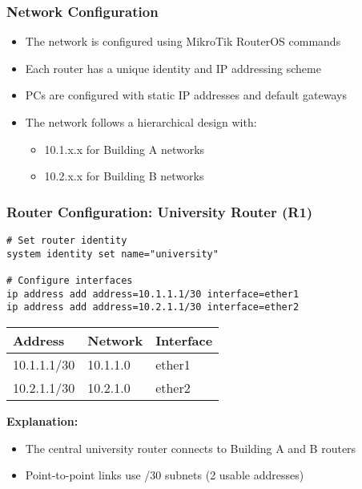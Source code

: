 \documentclass{beamer}
\begin{document}
\begin{frame}[label=config]
\frametitle{Network Configuration}
\begin{itemize}
    \item The network is configured using MikroTik RouterOS commands
    \item Each router has a unique identity and IP addressing scheme
    \item PCs are configured with static IP addresses and default gateways
    \item The network follows a hierarchical design with:
    \begin{itemize}
        \item 10.1.x.x for Building A networks
        \item 10.2.x.x for Building B networks
    \end{itemize}
\end{itemize}
\end{frame}

\begin{frame}
\frametitle{Router Configuration: University Router (R1)}
\begin{lstlisting}[escapechar=|]
# Set router identity
system identity set name="university"

# Configure interfaces
ip address add address=10.1.1.1/30 interface=ether1
ip address add address=10.2.1.1/30 interface=ether2
\end{lstlisting}

\begin{table}
\centering
\begin{tabular}{|l|l|l|}
\hline
\textbf{Address} & \textbf{Network} & \textbf{Interface} \\
\hline
10.1.1.1/30 & 10.1.1.0 & ether1 \\
\hline
10.2.1.1/30 & 10.2.1.0 & ether2 \\
\hline
\end{tabular}
\end{table}

\textbf{Explanation:} 
\begin{itemize}
    \item The central university router connects to Building A and B routers
    \item Point-to-point links use /30 subnets (2 usable addresses)
\end{itemize}
\end{frame}
\end{document}
